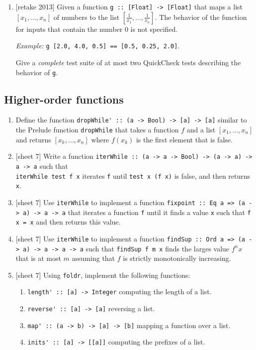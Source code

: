 \documentclass{article}
\def\code#1{\texttt{#1}}
\begin{document}
\begin{enumerate}
\item {[retake 2013]} Given a function \code{g :: [Float] -> [Float]} that maps a list $[x_1, \dots, x_n]$ of numbers to the list $[\frac{1}{x_1}, \dots, \frac{1}{x_n}]$. The behavior of the function for inputs that contain the number $0$ is not specified. \par
\textit{Example:} \code{g [2.0, 4.0, 0.5] == [0.5, 0.25, 2.0]}. \par
Give a \textit{complete} test suite of at most two QuickCheck tests describing the behavior of \code{g}.
\end{enumerate}

\subsection{Higher-order functions}
\begin{enumerate}
\item Define the function \verb|dropWhile' :: (a -> Bool) -> [a] -> [a]| similar to the Prelude function \verb|dropWhile| that takes a function $f$ and a list $[x_1, \dots, x_n]$ and returns $[x_k, \dots, x_n]$ where $f(x_k)$ is the first element that is false.

\item {[sheet 7]} Write a function \verb|iterWhile :: (a -> a -> Bool) -> (a -> a) -> a -> a| such that \\ \verb|iterWhile test f x| iterates \verb|f| until \verb|test x (f x)| is false, and then returns \verb|x|.

\item {[sheet 7]} Use \verb|iterWhile| to implement a function \verb|fixpoint :: Eq a => (a -> a) -> a -> a| that iterates a function \verb|f| until it finds a value \verb|x| such that \verb|f x = x| and then returns this value.

\item {[sheet 7]} Use \verb|iterWhile| to implement a function \verb|findSup :: Ord a => (a -> a) -> a -> a -> a| such that \verb|findSup f m x| finds the larges value $f^nx$ that is at most $m$ assuming that $f$ is strictly monotonically increasing.

\item {[sheet 7]} Using \verb|foldr|, implement the following functions:
\begin{enumerate}
\item \verb|length' :: [a] -> Integer| computing the length of a list.
\item \verb|reverse' :: [a] -> [a]| reversing a list.
\item \verb|map' :: (a -> b) -> [a] -> [b]| mapping a function over a list.
\item \verb|inits' :: [a] -> [[a]]| computing the prefixes of a list.
\end{enumerate}


\end{enumerate}
\end{document}
